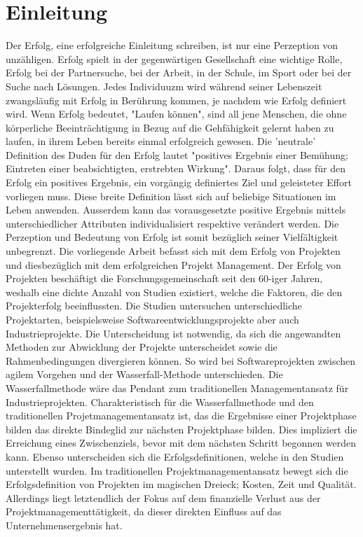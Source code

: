 \section{Einleitung}
Der Erfolg, eine erfolgreiche Einleitung schreiben, ist nur eine Perzeption von unzähligen. Erfolg spielt in der gegenwärtigen Gesellschaft eine wichtige Rolle, Erfolg bei der Partnersuche, bei der Arbeit, in der Schule, im Sport oder bei der Suche nach Lösungen. Jedes Individuuzm wird während seiner Lebenszeit zwangsläufig mit Erfolg in Berührung kommen, je nachdem wie Erfolg definiert wird. Wenn Erfolg bedeutet, "Laufen können", sind all jene Menschen, die ohne körperliche Beeinträchtigung in Bezug auf die Gehfähigkeit gelernt haben zu laufen, in ihrem Leben bereits einmal erfolgreich gewesen. Die 'neutrale' Definition des Duden für den Erfolg lautet "positives Ergebnis einer Bemühung; Eintreten einer beabsichtigten, erstrebten Wirkung". Daraus folgt, dass für den Erfolg ein positives Ergebnis, ein vorgängig definiertes Ziel und geleisteter Effort vorliegen muss. Diese breite Definition lässt sich auf beliebige Situationen im Leben anwenden. Ausserdem kann das vorausgesetzte positive Ergebnis mittels unterschiedlicher Attributen individualisiert respektive verändert werden. Die Perzeption und Bedeutung von Erfolg ist somit bezüglich seiner Vielfältigkeit unbegrenzt.
\newline\newline Die vorliegende Arbeit befasst sich mit dem Erfolg von Projekten und diesbezüglich mit dem erfolgreichen Projekt Management. Der Erfolg von Projekten beschäftigt die Forschungsgemeinschaft seit den 60-iger Jahren, weshalb eine dichte Anzahl von Studien existiert, welche die Faktoren, die den Projekterfolg beeinflussten. Die Studien untersuchen unterschiedliche Projektarten, beispielsweise Softwareentwicklungsprojekte aber auch Industrieprojekte. Die Unterscheidung ist notwendig, da sich die angewandten Methoden zur Abwicklung der Projekte unterscheidet sowie die Rahmenbedingungen divergieren können. So wird bei Softwareprojekten zwischen agilem Vorgehen und der Wasserfall-Methode unterschieden. Die Wasserfallmethode wäre das Pendant zum traditionellen Managementansatz für Industrieprojekten. Charakteristisch für die Wasserfallmethode und den traditionellen Projetmanagementansatz ist, das die Ergebnisse einer Projektphase bilden das direkte Bindeglid zur nächsten Projektphase bilden. Dies impliziert die Erreichung eines Zwischenziels, bevor mit dem nächsten Schritt begonnen werden kann. Ebenso unterscheiden sich die Erfolgsdefinitionen, welche in den Studien unterstellt wurden. Im traditionellen Projektmanagementansatz bewegt sich die Erfolgsdefinition von Projekten im magischen Dreieck; Kosten, Zeit und Qualität. Allerdings liegt letztendlich der Fokus auf dem finanzielle Verlust aus der Projektmanagementtätigkeit, da dieser direkten Einfluss auf das Unternehmensergebnis hat.
